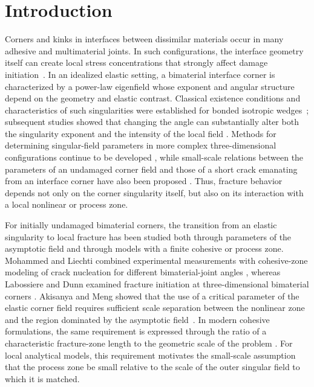 \section{Introduction}
\label{sec:introduction}

Corners and kinks in interfaces between dissimilar materials occur in many
adhesive and multimaterial joints. In such configurations, the interface
geometry itself can create local stress concentrations that strongly affect
damage initiation~\cite{GacoinEtAl2009}. In an idealized elastic setting, a
bimaterial interface corner is characterized by a power-law eigenfield whose
exponent and angular structure depend on the geometry and elastic contrast.
Classical existence conditions and characteristics of such singularities were
established for bonded isotropic wedges~\cite{BogyWang1971,DempseySinclair1981};
subsequent studies showed that changing the angle can substantially alter both
the singularity exponent and the intensity of the local field
\cite{MohammedLiechti2001}. Methods for determining singular-field parameters
in more complex three-dimensional configurations continue to be developed
\cite{MiyazakiFukudaNoda2025}, while small-scale relations between the
parameters of an undamaged corner field and those of a short crack emanating
from an interface corner have also been proposed
\cite{LyuZhangMai2026}. Thus, fracture behavior depends not only on the corner singularity itself,
but also on its interaction with a local nonlinear or process zone.

For initially undamaged bimaterial corners, the transition from an elastic
singularity to local fracture has been studied both through parameters of the
asymptotic field and through models with a finite cohesive or process zone.
Mohammed and Liechti combined experimental measurements with cohesive-zone
modeling of crack nucleation for different bimaterial-joint angles
\cite{MohammedLiechti2000}, whereas Labossiere and Dunn examined fracture
initiation at three-dimensional bimaterial corners
\cite{LabossiereDunn2001}. Akisanya and Meng showed that the use of a
critical parameter of the elastic corner field requires sufficient scale
separation between the nonlinear zone and the region dominated by the
asymptotic field~\cite{AkisanyaMeng2003}. In modern cohesive formulations,
the same requirement is expressed through the ratio of a characteristic
fracture-zone length to the geometric scale of the problem
\cite{GormanThouless2022,ThoulessGoutianos2023}. For local analytical models, this requirement motivates the small-scale
assumption that the process zone be small relative to the scale of the outer
singular field to which it is matched.

